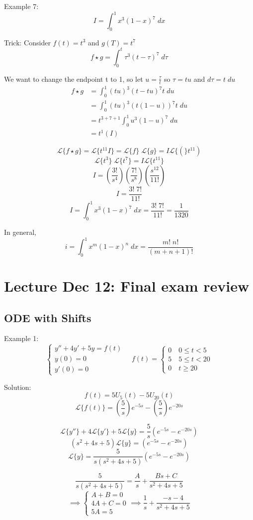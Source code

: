 \documentclass[12pt]{article}
\renewcommand{\L}[1]{\mathcal{L}\{#1\}}
\begin{document}
Example 7:
\[I = \int_0^1 x^3 (1 - x)^7 \; dx\]

Trick: Consider $f(t) = t^3$ and $g(T) = t^7$
\[f\star g = \int_0^t \tau^3 (t - \tau)^7\; d\tau\]

We want to change the endpoint t to 1, so let $u = \frac{\tau}{t}$ so $\tau = tu$ and $d\tau = t\; du$
\begin{align*}
    f\star g &= \int_0^1 (tu)^3 (t-tu)^7 t \; du\\
    &= \int_0^1 (tu)^3(t(1 -u))^7 t\; du\\
    &= t^{3+7+1} \int_0^1 u^3(1 - u)^7 \; du\\
    &= t^1 (I)
\end{align*}

\[\L{f\star g} = \L{t^11 I} = \L{f}\; \L{g} = I\L(t^11)\]
\[\L{t^3} \; \L{t^7} = I \L{t^11}\]
\[I = \left(\frac{3!}{s^4}\right)\left(\frac{7!}{s^8}\right)\left(\frac{s^12}{11!}\right)\]
\[I = \frac{3! \; 7!}{11!}\]
\[\boxed{I = \int_0^1 x^3(1 -x)^7\; dx = \frac{3!\; 7!}{11!} = \frac{1}{1320}}\]

In general, 
\[i = \int_0^1 x^m (1 -x)^n \; dx = \frac{m! \; n!}{(m + n+ 1)!}\]

\section{Lecture Dec 12: Final exam review}
\subsection*{ODE with Shifts}
Example 1:
\[\begin{cases}
    y'' + 4y' + 5y = f(t)\\
    y(0) = 0\\
    y'(0) =0
\end{cases} \quad f(t) = \begin{cases}
    0 \quad 0 \leq t < 5\\
    5 \quad 5 \leq t < 20\\
    0 \quad t \geq 20
\end{cases}\]

Solution:
\[f(t) = 5U_5(t) - 5U_{20}(t)\]
\[\L{f(t)} = \left(\frac{5}{s}\right)e^{-5s} - \left(\frac{5}{s}\right)e^{-20s}\]

\[\L{y''} + 4\L{y'} + 5\L{y} = \frac{5}{s}\left(e^{-5s} - e^{-20s}\right)\]
\[(s^2 + 4s + 5)\L{y} = \left(e^{-5s} - e^{-20s}\right)\]
\[\L{y} = \frac{5}{s(s^2 + 4s + 5)}\left(e^{-5s} - e^{-20s}\right)\]

\[\frac{5}{s(s^2 + 4s + 5)} = \frac{A}{s} + \frac{Bs + C}{s^2 + 4s + 5}\]
\[\implies \begin{cases}
    A + B = 0\\
    4A + C = 0\\
    5A = 5
\end{cases} \implies \frac{1}{s} + \frac{-s - 4}{s^2 + 4s + 5}\]
\end{document}
